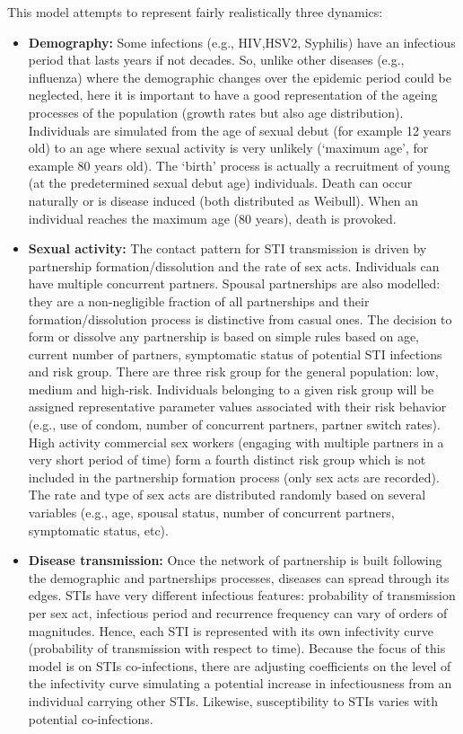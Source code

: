 \documentclass[11pt, onecolumn]{article}
\begin{document}
This model attempts to represent fairly realistically three dynamics:
\begin{itemize}
\item \textbf{Demography:} Some infections (e.g., HIV,HSV2, Syphilis) have an infectious period that lasts years if not decades. So, unlike other diseases (e.g., influenza) where the demographic changes over the epidemic period could be neglected, here it is important to have a good representation of the ageing processes of the population (growth rates but also age distribution). Individuals are simulated from the age of sexual debut (for example 12 years old) to an age where sexual activity is very unlikely (`maximum age', for example 80 years old). The `birth' process is actually a recruitment of young (at the predetermined sexual debut age) individuals. Death can occur naturally or is disease induced (both distributed as Weibull). When an individual reaches the maximum age (80 years), death is provoked. 

\item \textbf{Sexual activity:} The contact pattern for STI transmission is driven by partnership formation/dissolution and the rate of sex acts. Individuals can have multiple concurrent partners. Spousal partnerships are also modelled: they are a non-negligible fraction of all partnerships and their formation/dissolution process is distinctive from casual ones. The decision to form or dissolve any partnership is based on simple rules based on age, current number of partners, symptomatic status of potential STI infections and risk group. 
There are three risk group for the general population: low, medium and high-risk. Individuals belonging to a given risk group will be assigned representative parameter values associated with their risk behavior (e.g., use of condom, number of concurrent partners, partner switch rates). High activity commercial sex workers (engaging with multiple partners in a very short period of time) form a fourth distinct risk group which is not included in the partnership formation process (only sex acts are recorded).
The rate and type of sex acts are distributed randomly based on several variables (e.g., age, spousal status, number of concurrent partners, symptomatic status, etc).

\item \textbf{Disease transmission:} Once the network of partnership is built following the demographic and partnerships processes, diseases can spread through its edges. STIs have very different infectious features: probability of transmission per sex act, infectious period and recurrence frequency can vary of orders of magnitudes. Hence, each STI is represented with its own infectivity curve (probability of transmission with respect to time). Because the focus of this model is on STIs co-infections, there are adjusting coefficients on the level of the infectivity curve simulating a potential increase in infectiousness from an individual carrying other STIs. Likewise, susceptibility to STIs varies with potential co-infections.

\end{itemize}
\end{document}
